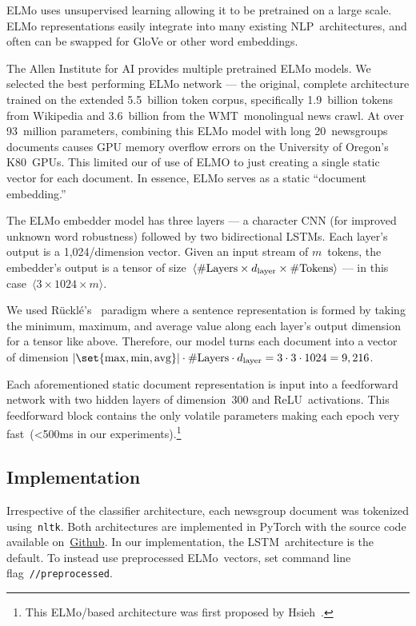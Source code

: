 ELMo uses unsupervised learning allowing it to be pretrained on a large scale.  ELMo representations easily integrate into many existing NLP~architectures, and often can be swapped for GloVe or other word embeddings.

The Allen Institute for AI provides multiple pretrained ELMo models.  We selected the best performing ELMo network --- the original, complete architecture trained on the extended 5.5~billion token corpus, specifically 1.9~billion tokens from Wikipedia and 3.6~billion from the WMT~monolingual news crawl. At over 93~million parameters, combining this ELMo model with long 20~newsgroups documents causes GPU memory overflow errors on the University of Oregon's K80~GPUs.  This limited our of use of ELMO to just creating a single static vector for each document. In essence, ELMo serves as a static ``document embedding.''

The ELMo embedder model has three layers --- a character CNN (for improved unknown word robustness) followed by two bidirectional LSTMs.  Each layer's output is a 1,024\-/dimension vector.  Given an input stream of $m$~tokens, the embedder's output is a tensor of size~${\langle \textnormal{\#Layers} \times d_{\textnormal{layer}} \times \textnormal{\#Tokens} \rangle}$ --- in this case~${\langle 3 \times 1024 \times m \rangle}$.

We used R\"{u}ckl\'{e}\etal's~\cite{Ruckle:2018} paradigm where a sentence representation is formed by taking the minimum, maximum, and average value along each layer's output dimension for a tensor like above. Therefore, our model turns each document into a vector of dimension ${\abs{\set{\max,\min,\textnormal{avg}}} \cdot \textnormal{\#Layers} \cdot d_{\textnormal{layer}} = 3 \cdot 3 \cdot 1024 = 9,216}$.

Each aforementioned static document representation is input into a feedforward network with two hidden layers of dimension~300 and ReLU~activations. This feedforward block contains the only volatile parameters making each epoch very fast~(<500ms in our experiments).\footnote{This ELMo\-/based architecture was first proposed by Hsieh\etal~\cite{Hsieh:2018}.}

\subsection{Implementation}

Irrespective of the classifier architecture, each newsgroup document was tokenized using~\texttt{nltk}. Both architectures are implemented in PyTorch with the source code available on~\href{\sourceCode}{Github}.  In our implementation, the LSTM~architecture is the default. To instead use preprocessed ELMo~vectors, set command line flag~\texttt{\mbox{\-/\-/preprocessed}}.
